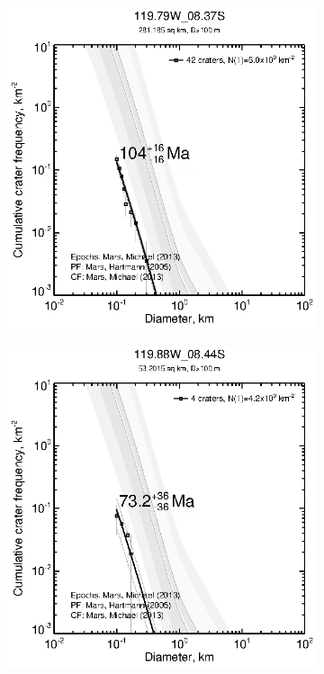 \documentclass[12pt,letter]{article}
\begin{document}
\begin{figure}[h]
\begin{subfigure}{.33\textwidth}
  \includegraphics[width=\linewidth,clip,trim=1cm 1cm 1.5cm 1cm]{figures/craterstats/119-79W_08-37S_100m_cum.eps}
\end{subfigure}
\begin{subfigure}{.33\textwidth}
  \includegraphics[width=\linewidth,clip,trim=1cm 1cm 1.5cm 1cm]{figures/craterstats/119-88W_08-44S_100m_cum.eps}

\end{subfigure}
\end{figure}
\end{document}
